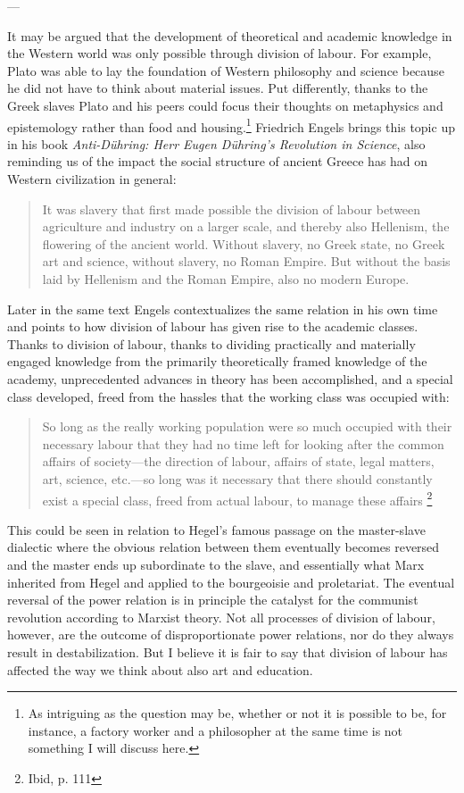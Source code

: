 \documentclass[12pt]{article}
\begin{document}
---

It may be argued that the development of theoretical and academic knowledge in the Western world was only possible through division of labour. For example, Plato was able to lay the foundation of Western philosophy and science because he did not have to think about material issues. Put differently, thanks to the Greek slaves Plato and his peers could focus their thoughts on metaphysics and epistemology rather than food and housing.\footnote{As intriguing as the question may be, whether or not it is possible to be, for instance, a factory worker and a philosopher at the same time is not something I will discuss here.} Friedrich Engels brings this topic up in his book \emph{Anti-Dühring: Herr Eugen Dühring's Revolution in Science}, also reminding us of the impact the social structure of ancient Greece has had on Western civilization in general:
\begin{quote}
  It was slavery that first made possible the division of labour
  between agriculture and industry on a larger scale, and thereby also
  Hellenism, the flowering of the ancient world. Without slavery, no
  Greek state, no Greek art and science, without slavery, no Roman
  Empire. But without the basis laid by Hellenism and the Roman
  Empire, also no modern Europe. 
\end{quote}
Later in the same text Engels contextualizes the same relation in his own time and  points to how division of labour has given rise to the academic classes. Thanks to division of labour, thanks to dividing practically and materially engaged knowledge from the primarily theoretically framed knowledge of the academy, unprecedented advances in theory has been accomplished, and a special class developed, freed from the hassles that the working class was occupied with:
\begin{quote}
  So long as the really working population were so much occupied with
  their necessary labour that they had no time left for looking after
  the common affairs of society---the direction of labour, affairs of
  state, legal matters, art, science, etc.---so long was it necessary
  that there should constantly exist a special class, freed from
  actual labour, to manage these affairs \footnote{Ibid, p. 111}
\end{quote}

This could be seen in relation to Hegel's famous passage on the master-slave dialectic where the obvious relation between them eventually becomes reversed and the master ends up subordinate to the slave,  and essentially what Marx inherited from Hegel and applied to the bourgeoisie and proletariat. The eventual reversal of the power relation is in principle the catalyst for the communist revolution according to Marxist theory. Not all processes of division of labour, however, are the outcome of disproportionate power relations, nor do they always result in destabilization. But I believe it is fair to say that division of labour has affected the way we think about also art and education.
\end{document}
